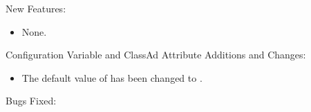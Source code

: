 \noindent New Features:

\begin{itemize}

\item None.

\end{itemize}

\noindent Configuration Variable and ClassAd Attribute Additions and Changes:

\begin{itemize}

\item The default value of  
has been changed to .

\end{itemize}

\noindent Bugs Fixed:

